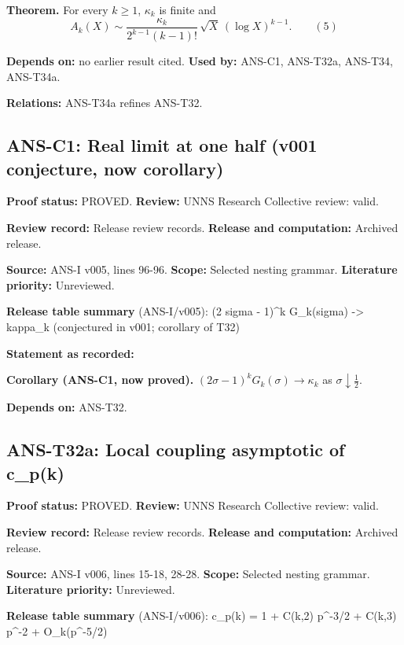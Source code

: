 \documentclass[
  11pt,
]{article}
\begin{document}
\textbf{Theorem.} For every \(k\ge1\), \(\kappa_k\) is finite and
\[A_k(X)\sim\frac{\kappa_k}{2^{k-1}(k-1)!}\,\sqrt X\,(\log X)^{k-1}.\qquad(5)\]

\textbf{Depends on:} no earlier result cited. \textbf{Used by:} ANS-C1,
ANS-T32a, ANS-T34, ANS-T34a.

\textbf{Relations:} ANS-T34a refines ANS-T32.

\hypertarget{ans-c1-real-limit-at-one-half-v001-conjecture-now-corollary}{%
\subsection{ANS-C1: Real limit at one half (v001 conjecture, now
corollary)}\label{ans-c1-real-limit-at-one-half-v001-conjecture-now-corollary}}

\textbf{Proof status:} PROVED. \textbf{Review:} UNNS Research Collective
review: valid.

\textbf{Review record:} Release review records. \textbf{Release and
computation:} Archived release.

\textbf{Source:} ANS-I v005, lines 96-96. \textbf{Scope:} Selected
nesting grammar. \textbf{Literature priority:} Unreviewed.

\textbf{Release table summary} (ANS-I/v005): (2 sigma - 1)\^{}k
G\_k(sigma) -\textgreater{} kappa\_k (conjectured in v001; corollary of
T32)

\textbf{Statement as recorded:}

\textbf{Corollary (ANS-C1, now proved).}
\((2\sigma-1)^kG_k(\sigma)\to\kappa_k\) as \(\sigma\downarrow\tfrac12\).

\textbf{Depends on:} ANS-T32.

\hypertarget{ans-t32a-local-coupling-asymptotic-of-c_pk}{%
\subsection{ANS-T32a: Local coupling asymptotic of
c\_p(k)}\label{ans-t32a-local-coupling-asymptotic-of-c_pk}}

\textbf{Proof status:} PROVED. \textbf{Review:} UNNS Research Collective
review: valid.

\textbf{Review record:} Release review records. \textbf{Release and
computation:} Archived release.

\textbf{Source:} ANS-I v006, lines 15-18, 28-28. \textbf{Scope:}
Selected nesting grammar. \textbf{Literature priority:} Unreviewed.

\textbf{Release table summary} (ANS-I/v006): c\_p(k) = 1 + C(k,2)
p\^{}-3/2 + C(k,3) p\^{}-2 + O\_k(p\^{}-5/2)
\end{document}
